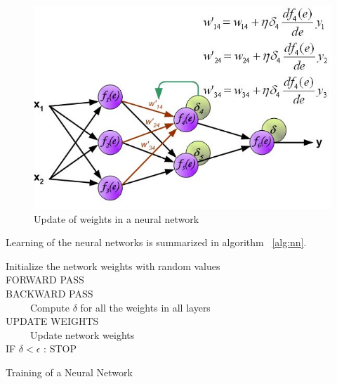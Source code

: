 \begin{enumerate}
\begin{figure}[H]
	\centering
   \includegraphics[scale=0.86]{figures/intro/weight_update.bmp}
   \caption[Weight Update]{Update of weights in a neural network}
   \label{fig:weight_update}
\end{figure}

Learning of the neural networks is summarized in algorithm ~\ref{alg:nn}.

\begin{algorithm}[H]
    Initialize the network weights with random values\\
    FORWARD PASS \\
    BACKWARD PASS \\
    ~~~~~Compute $\delta$ for all the weights in all layers \\
    UPDATE WEIGHTS \\
    ~~~~~Update network weights \\
    IF $\delta < \epsilon$ : STOP
    
    \caption[Training of a Neural Network]{Training of a Neural Network}
    \label{alg:nn}
\end{algorithm}



\end{enumerate}

